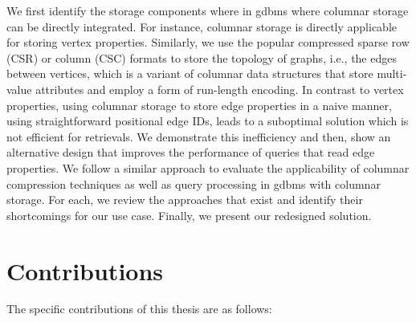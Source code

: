 We first identify the storage components where in \gls{gdbms} where columnar storage can be directly integrated. For instance, columnar storage is directly applicable for storing vertex properties. Similarly, we use the popular compressed sparse row (CSR) or column (CSC) formats to store the topology of graphs, i.e., the edges between vertices, which is a variant of columnar data structures that store multi-value attributes and  employ a form of run-length encoding. In contrast to vertex properties, using columnar storage to store edge properties in a naive manner, using straightforward positional edge IDs, leads to a suboptimal solution which is not efficient for retrievals. We demonstrate this inefficiency and then, show an alternative design that improves the performance of queries that read edge properties. We follow a similar approach to evaluate the applicability of columnar compression techniques as well as query processing in \gls{gdbms} with columnar storage. For each, we review the approaches that exist and identify their shortcomings for our use case. Finally, we present our redesigned solution. 

\section{Contributions}

The specific contributions of this thesis are as follows:

